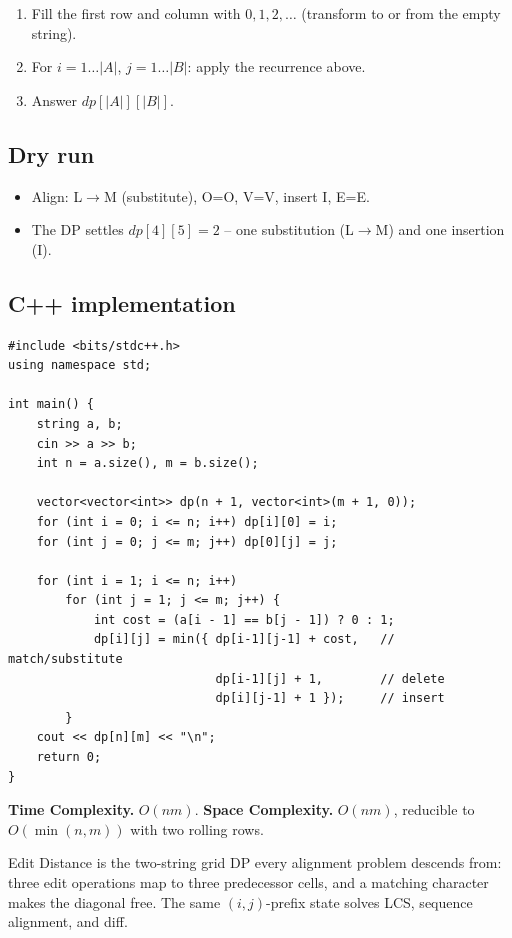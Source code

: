 \begin{enumerate}
  \item Fill the first row and column with $0,1,2,\ldots$ (transform to
        or from the empty string).
  \item For $i=1\ldots|A|$, $j=1\ldots|B|$: apply the recurrence above.
  \item Answer $\textit{dp}[|A|][|B|]$.
\end{enumerate}

\subsection*{Dry run}


\begin{itemize}
  \item Align: L$\to$M (substitute), O=O, V=V, insert I, E=E.
  \item The DP settles $\textit{dp}[4][5]=2$ -- one substitution
        (L$\to$M) and one insertion (I).
\end{itemize}

\subsection*{C++ implementation}

\begin{lstlisting}
#include <bits/stdc++.h>
using namespace std;

int main() {
    string a, b;
    cin >> a >> b;
    int n = a.size(), m = b.size();

    vector<vector<int>> dp(n + 1, vector<int>(m + 1, 0));
    for (int i = 0; i <= n; i++) dp[i][0] = i;
    for (int j = 0; j <= m; j++) dp[0][j] = j;

    for (int i = 1; i <= n; i++)
        for (int j = 1; j <= m; j++) {
            int cost = (a[i - 1] == b[j - 1]) ? 0 : 1;
            dp[i][j] = min({ dp[i-1][j-1] + cost,   // match/substitute
                             dp[i-1][j] + 1,        // delete
                             dp[i][j-1] + 1 });     // insert
        }
    cout << dp[n][m] << "\n";
    return 0;
}
\end{lstlisting}

\begin{complexitybox}
\textbf{Time Complexity.} $O(nm)$. \textbf{Space Complexity.} $O(nm)$,
reducible to $O(\min(n,m))$ with two rolling rows.
\end{complexitybox}

\begin{takeawaybox}
Edit Distance is the two-string grid DP every alignment problem descends
from: three edit operations map to three predecessor cells, and a matching
character makes the diagonal free. The same $(i,j)$-prefix state solves
LCS, sequence alignment, and diff.
\end{takeawaybox}
